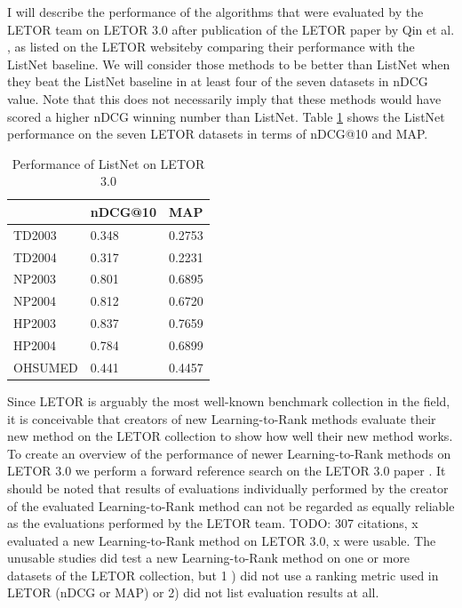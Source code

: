 I will describe the performance of the algorithms that were evaluated by the LETOR team on LETOR 3.0 after publication of the LETOR paper by Qin et al. \cite{Qin2010}, as listed on the LETOR website\footnotemark[2] by comparing their performance with the ListNet baseline. We will consider those methods to be better than ListNet when they beat the ListNet baseline in at least four of the seven datasets in \ac{nDCG} value. Note that this does not necessarily imply that these methods would have scored a higher \ac{nDCG} winning number than ListNet. Table \ref{tbl:LETOR_ListNet} shows the ListNet performance on the seven LETOR datasets in terms of \ac{nDCG}@10 and \ac{MAP}.
\begin{table}
\begin{tabular}{l|ll}
 & \ac{nDCG}@10 & \ac{MAP} \\ 
 \hline
TD2003 & 0.348 & 0.2753 \\ 
TD2004 & 0.317 & 0.2231 \\ 
NP2003 & 0.801 & 0.6895 \\ 
NP2004 & 0.812 & 0.6720 \\ 
HP2003 & 0.837 & 0.7659 \\ 
HP2004 & 0.784 & 0.6899 \\ 
OHSUMED & 0.441 & 0.4457 \\ 
\end{tabular}
\caption{Performance of ListNet on LETOR 3.0}
\label{tbl:LETOR_ListNet}
\end{table}

Since LETOR is arguably the most well-known benchmark collection in the field, it is conceivable that creators of new Learning-to-Rank methods evaluate their new method on the LETOR collection to show how well their new method works. To create an overview of the performance of newer Learning-to-Rank methods on LETOR 3.0 we perform a forward reference search on the LETOR 3.0 paper \cite{Qin2010}. It should be noted that results of evaluations individually performed by the creator of the evaluated Learning-to-Rank method can not be regarded as equally reliable as the evaluations performed by the LETOR team. TODO: 307 citations, x evaluated a new Learning-to-Rank method on LETOR 3.0, x were usable. The unusable studies did test a new Learning-to-Rank method on one or more datasets of the LETOR collection, but 1 ) did not use a ranking metric used in LETOR (\ac{nDCG} or \ac{MAP}) or 2) did not list evaluation results at all.\\

